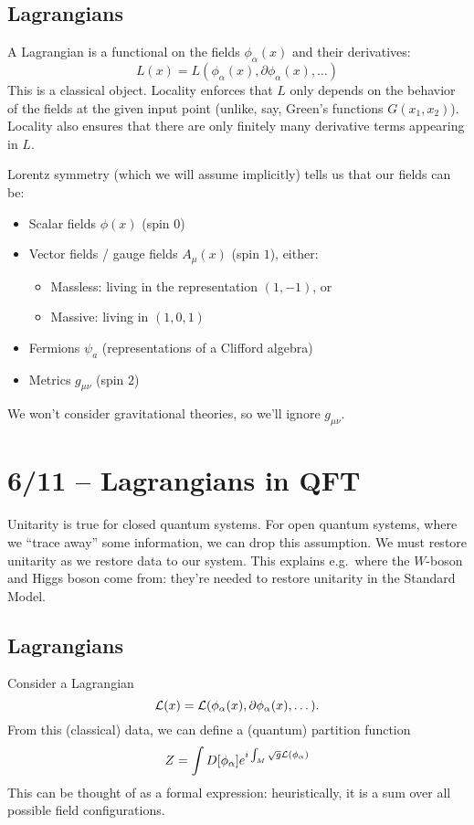 \subsection{Lagrangians}

A Lagrangian is a functional on the fields $\phi_\alpha(x)$ and their derivatives:
\[
	L(x) = L(\phi_\alpha(x), \partial \phi_\alpha(x), \dots)
\]
This is a classical object.
Locality enforces that $L$ only depends on the behavior of the fields at the given input point (unlike, say, Green's functions $G(x_1, x_2)$).
Locality also ensures that there are only finitely many derivative terms appearing in $L$.

Lorentz symmetry (which we will assume implicitly) tells us that our fields can be:
\begin{itemize}
	\item Scalar fields $\phi(x)$ (spin $0$)
	\item Vector fields / gauge fields $A_\mu(x)$ (spin $1$), either:
		\begin{itemize}
			\item Massless: living in the representation $(1, -1)$, or
			\item Massive: living in $(1, 0, 1)$
		\end{itemize}
	\item Fermions $\psi_a$ (representations of a Clifford algebra)
	\item Metrics $g_{\mu \nu}$ (spin $2$)
\end{itemize}
We won't consider gravitational theories, so we'll ignore $g_{\mu \nu}$.

\section{6/11 -- Lagrangians in QFT}

Unitarity is true for closed quantum systems.
For open quantum systems, where we ``trace away'' some information, we can drop this assumption.
We must restore unitarity as we restore data to our system.
This explains e.g.\ where the $W$-boson and Higgs boson come from: they're needed to restore unitarity in the Standard Model.

\subsection{Lagrangians}

Consider a Lagrangian
\[
	\mathcal{L}(x) = \mathcal{L}(\phi_\alpha(x), \partial \phi_\alpha(x), \dots).
\]
From this (classical) data, we can define a (quantum) partition function
\[
	Z = \int D[\phi_\alpha] e^{i \int_M \sqrt{g} \mathcal{L}(\phi_\alpha)}
\]
This can be thought of as a formal expression: heuristically, it is a sum over all possible field configurations.

